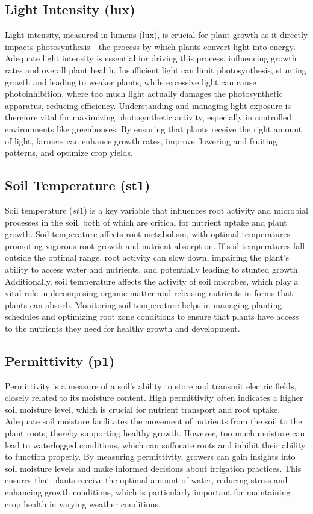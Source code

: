 \subsection{Light Intensity (lux)}

Light intensity, measured in lumens (lux), is crucial for plant growth as it directly impacts photosynthesis—the process by which plants convert light into energy. Adequate light intensity is essential for driving this process, influencing growth rates and overall plant health. Insufficient light can limit photosynthesis, stunting growth and leading to weaker plants, while excessive light can cause photoinhibition, where too much light actually damages the photosynthetic apparatus, reducing efficiency. Understanding and managing light exposure is therefore vital for maximizing photosynthetic activity, especially in controlled environments like greenhouses. By ensuring that plants receive the right amount of light, farmers can enhance growth rates, improve flowering and fruiting patterns, and optimize crop yields.

\subsection{Soil Temperature (st1)}

Soil temperature (\( st1 \)) is a key variable that influences root activity and microbial processes in the soil, both of which are critical for nutrient uptake and plant growth. Soil temperature affects root metabolism, with optimal temperatures promoting vigorous root growth and nutrient absorption. If soil temperatures fall outside the optimal range, root activity can slow down, impairing the plant's ability to access water and nutrients, and potentially leading to stunted growth. Additionally, soil temperature affects the activity of soil microbes, which play a vital role in decomposing organic matter and releasing nutrients in forms that plants can absorb. Monitoring soil temperature helps in managing planting schedules and optimizing root zone conditions to ensure that plants have access to the nutrients they need for healthy growth and development.

\subsection{Permittivity (p1)}

Permittivity is a measure of a soil's ability to store and transmit electric fields, closely related to its moisture content. High permittivity often indicates a higher soil moisture level, which is crucial for nutrient transport and root uptake. Adequate soil moisture facilitates the movement of nutrients from the soil to the plant roots, thereby supporting healthy growth. However, too much moisture can lead to waterlogged conditions, which can suffocate roots and inhibit their ability to function properly. By measuring permittivity, growers can gain insights into soil moisture levels and make informed decisions about irrigation practices. This ensures that plants receive the optimal amount of water, reducing stress and enhancing growth conditions, which is particularly important for maintaining crop health in varying weather conditions.

